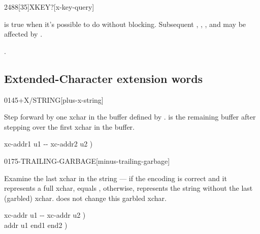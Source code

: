 \vspace*{-6ex}
\begin{worddef}[XKEYq]{2488}[35]{XKEY?}[x-key-query]%
\item {}

	 is true when it's possible to do  without
	blocking.  Subsequent , ,
	, and  may be affected
	by .

\see {}.
\end{worddef}


\subsection{Extended-Character extension words} %
\extended

\begin{worddef}{0145}{+X/STRING}[plus-x-string]%
\item {}

	Step forward by one xchar in the buffer defined by .
	 is the remaining buffer after stepping over the
	first xchar in the buffer.

	\begin{implement} %
	\word{:}   xc-addr1 u1 -{}- xc-addr2 u2 ) \\
	\tab {}    \word{-}  \word{;}
	\end{implement}
\end{worddef}

\vspace*{-2ex}
\begin{worddef}{0175}{-TRAILING-GARBAGE}[minus-trailing-garbage]%
\item {}

	Examine the last xchar in the string  --- if the
	encoding is correct and it represents a full xchar,  equals
	, otherwise,  represents the string without the
	last (garbled) xchar.   does not change this
	garbled xchar.

	\begin{implement} %
	\word{:}   xc-addr u1 -{}- xc-addr u2 ) \\
	\tab {} \word{+}    addr u1 end1 end2 ) \\
	\tab {}    \word{-}  \word{+} \word{=}    \\
	\tab[2]  \\
	\tab {} \\
	\tab[2]    \word{-} \\
	\tab {} \word{;}
	\end{implement}
\end{worddef}

